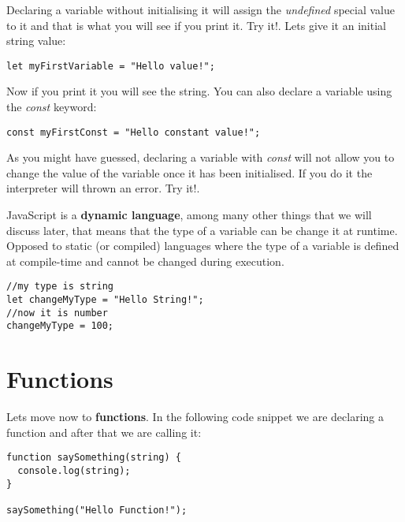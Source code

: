 \documentclass[a4paper, oneside, titlepage, 12pt]{book}
\begin{document}
Declaring a variable without initialising it will assign the \textit{undefined} special value to it and that is what you will see if you print it. Try it!. Lets give it an initial string value:

\begin{verbatim}
let myFirstVariable = "Hello value!";
\end{verbatim}

Now if you print it you will see the string. You can also declare a variable using the \textit{const} keyword:

\begin{verbatim}
const myFirstConst = "Hello constant value!";
\end{verbatim}

As you might have guessed, declaring a variable with \textit{const} will not allow you to change the value of the variable once it has been initialised. If you do it the interpreter will thrown an error. Try it!.  
\newline

JavaScript is a \textbf{dynamic language}, among many other things that we will discuss later, that means that the type of a variable can be change it at runtime. Opposed to static (or compiled) languages where the type of a variable is defined at compile-time and cannot be changed during execution.

\begin{verbatim}
//my type is string
let changeMyType = "Hello String!";
//now it is number
changeMyType = 100;
\end{verbatim}

\section{Functions} \label{functions}

Lets move now to \textbf{functions}. In the following code snippet we are declaring a function and after that we are calling it:

\begin{verbatim}
function saySomething(string) {
  console.log(string);
}

saySomething("Hello Function!");
\end{verbatim}
\end{document}
